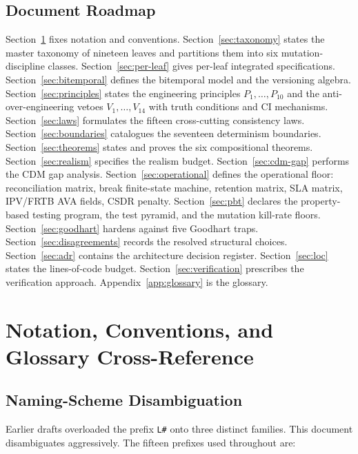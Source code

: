 \documentclass[11pt,a4paper]{article}
\begin{document}
\subsection{Document Roadmap}
\label{sec:intro-roadmap}

Section~\ref{sec:notation} fixes notation and conventions. Section~\ref{sec:taxonomy} states the master taxonomy of nineteen leaves and partitions them into six mutation-discipline classes. Section~\ref{sec:per-leaf} gives per-leaf integrated specifications. Section~\ref{sec:bitemporal} defines the bitemporal model and the versioning algebra. Section~\ref{sec:principles} states the engineering principles $P_1,\dots,P_{10}$ and the anti-over-engineering vetoes $V_1,\dots,V_{14}$ with truth conditions and CI mechanisms. Section~\ref{sec:laws} formulates the fifteen cross-cutting consistency laws. Section~\ref{sec:boundaries} catalogues the seventeen determinism boundaries. Section~\ref{sec:theorems} states and proves the six compositional theorems. Section~\ref{sec:realism} specifies the realism budget. Section~\ref{sec:cdm-gap} performs the CDM gap analysis. Section~\ref{sec:operational} defines the operational floor: reconciliation matrix, break finite-state machine, retention matrix, SLA matrix, IPV/FRTB AVA fields, CSDR penalty. Section~\ref{sec:pbt} declares the property-based testing program, the test pyramid, and the mutation kill-rate floors. Section~\ref{sec:goodhart} hardens against five Goodhart traps. Section~\ref{sec:disagreements} records the resolved structural choices. Section~\ref{sec:adr} contains the architecture decision register. Section~\ref{sec:loc} states the lines-of-code budget. Section~\ref{sec:verification} prescribes the verification approach. Appendix~\ref{app:glossary} is the glossary.

\clearpage
\section{Notation, Conventions, and Glossary Cross-Reference}
\label{sec:notation}

\subsection{Naming-Scheme Disambiguation}
\label{sec:notation-prefixes}

Earlier drafts overloaded the prefix \texttt{L\#} onto three distinct families. This document disambiguates aggressively. The fifteen prefixes used throughout are:
\end{document}

